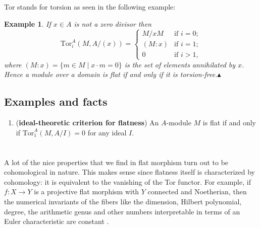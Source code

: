 \documentclass[12pt]{article}
\theoremstyle{mytheoremstyle}
\newtheorem{example}{Example}
\newcommand{\tor}{\text{Tor}}
\begin{document}
Tor stands for torsion as seen in the following example:
\begin{example}
    If $x\in A$ is not a zero divisor then
    $$\tor^A_i(M,A/(x))=\begin{cases}
            M/xM  & \text{if } i=0; \\
            (M:x) & \text{if } i=1; \\
            0     & \text{if } i>1,
        \end{cases}$$
    where $(M:x)=\{m\in M\mid x\cdot m=0\}$ is the set of elements
    annihilated by $x$. Hence a module over a domain is flat if and
    only if it is torsion-free.$\blacktriangle$
\end{example}

\subsection{Examples and facts}
\begin{enumerate}
    \item (\textbf{ideal-theoretic criterion for flatness}) An
          $A$-module $M$ is flat if and only if $\tor^A_1(M,A/I)=0$
          for any ideal $I$.
\end{enumerate}

\section{}
\hspace*{8mm} A lot of the nice properties that we find in flat morphism
turn out to be cohomological in nature. This makes sense since flatness itself
is characterized by cohomology: it is equivalent to the vanishing of the Tor
functor. For example, if $f\colon X\to Y$ is a projective flat morphism with
$Y$ connected and Noetherian, then the numerical invariants of the fibers like
the dimension, Hilbert polynomial, degree, the arithmetic genus and other numbers
interpretable in terms of an Euler characteristic are constant \cite{vakil2023foundations}.

\newpage

\setcounter{section}{1}
\setcounter{theorem}{1}

\printbibliography
\end{document}
